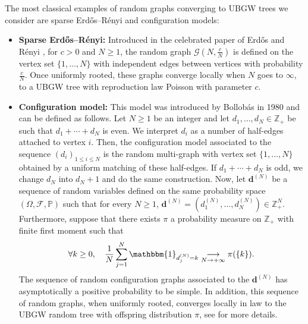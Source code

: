 \documentclass[11pt]{article}
\begin{document}
\bigskip

The most classical examples of random graphs converging to UBGW trees we consider are sparse Erdős–Rényi  and configuration models:
\begin{itemize}
    \item \textbf{Sparse Erdős–Rényi:} Introduced in the celebrated paper of Erdős and Rényi \cite{ErdosRenyi}, for $c>0$ and $N\geq 1$, the random graph $\mathcal G (N,\frac{c}{N})$ is defined on the vertex set $\{1,\ldots, N \}$ with independent edges between vertices with probability $\frac{c}{N}$. Once uniformly rooted, these graphs converge locally when $N$ goes to $\infty$, to a UBGW tree with reproduction law Poisson with parameter $c$.
    \item \textbf{Configuration model:} This model was introduced by Bollob\'as in 1980 \cite{B1980} and can be defined as follows.
Let $N\geq 1$ be an integer and let $d_1, \ldots, d_N \in \mathbb{Z}_+$ be such that $d_1 + \cdots +d_N$ is even. We interpret $d_i$ as a number of half-edges attached to vertex $i$. Then, the configuration model associated to the sequence $(d_i)_{1 \leq i \leq N}$ is the random multi-graph with vertex set $\{1, \ldots ,N\}$ obtained by a uniform matching of these half-edges. If $d_1 + \cdots + d_N$ is odd, we change $d_N$ into $d_N+1$ and do the same construction. Now, let $\mathbf{d}^{(N)}$ be a sequence of random variables defined on the same probability space $(\Omega,\mathcal{F},\mathbb{P})$ such that for every $N\geq 1$, $\mathbf{d}^ {(N)} = (d_1^{(N)}, \ldots, d_N^{(N)}) \in \mathbb{Z}_+^N$. Furthermore, suppose that there exists $\pi$ a probability measure on $\mathbb{Z}_+$ with finite first moment such that
\[  \forall k \geq 0, \quad \frac{1}{N} \sum\limits_{ j=1}^N \mathbbm{1}_{ d_j^{(N)} = k}  \underset{ N \rightarrow +\infty}{ \longrightarrow} \pi( \{k\}).   \]
The sequence of random configuration graphs associated to the $\mathbf{d}^{(N)}$ has asymptotically a positive probability to be simple. In addition, this sequence of random graphs, when uniformly rooted, converges locally in law to the UBGW random tree with offspring distribution $\pi$, see \cite{vanderHofstadBook2} for more details.
\end{itemize}
\end{document}
